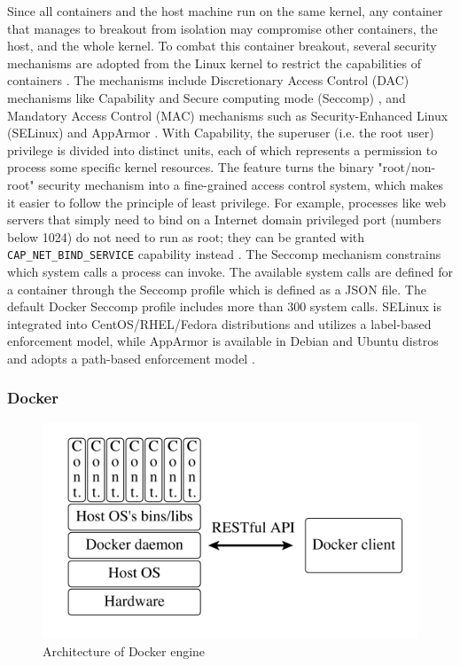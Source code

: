 \documentclass[english, 12pt, a4paper, sci, utf8, a-2b, online]{aaltothesis}
\begin{document}
Since all containers and the host machine run on the same kernel, any container that manages to breakout from isolation may compromise other containers, the host, and the whole kernel.
To combat this container breakout, several security mechanisms are adopted from the Linux kernel to restrict the capabilities of containers \cite{lin2018measurement}.
The mechanisms include Discretionary Access Control (DAC) mechanisms like Capability \cite{manpages-capabilities} and Secure computing mode (Seccomp) \cite{manpages-seccomp}, and Mandatory Access Control (MAC) mechanisms such as Security-Enhanced Linux (SELinux) and AppArmor \cite{apparmor}.
With Capability, the superuser (i.e. the root user) privilege is divided into distinct units, each of which represents a permission to process some specific kernel resources.
The feature turns the binary "root/non-root" security mechanism into a fine-grained access control system, which makes it easier to follow the principle of least privilege.
For example, processes like web servers that simply need to bind on a Internet domain privileged port (numbers below 1024) do not need to run as root; they can be granted with \texttt{CAP\_NET\_BIND\_SERVICE} capability instead \cite{docker-security}.
The Seccomp mechanism constrains which system calls a process can invoke.
The available system calls are defined for a container through the Seccomp profile which is defined as a JSON file.
The default Docker Seccomp profile \cite{docker-default-seccomp} includes more than 300 system calls.
SELinux is integrated into CentOS/RHEL/Fedora distributions and utilizes a label-based enforcement model, while AppArmor is available in Debian and Ubuntu distros and adopts a path-based enforcement model \cite{lin2018measurement}.

\subsubsection{Docker}

\begin{figure}[h!]
  \centering
  \includegraphics[width=\linewidth]{files/docker-engine.png} %
  \caption{Architecture of Docker engine \cite{bui2015analysis}}
  \label{figure-docker}
\end{figure}
\end{document}
